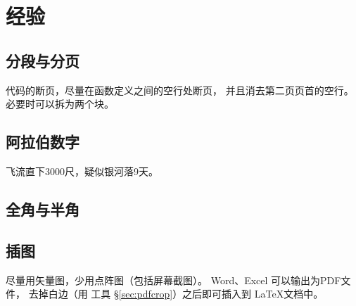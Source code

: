 \chapter{经验}

\section{分段与分页}



代码的断页，尽量在函数定义之间的空行处断页，
并且消去第二页页首的空行。必要时可以拆为两个块。

\section{阿拉伯数字}

飞流直下3000尺，疑似银河落9天。

\section{全角与半角}

\section{插图}

尽量用矢量图，少用点阵图（包括屏幕截图）。
Word、Excel 可以输出为PDF文件，
去掉白边（用  工具 \S \ref{sec:pdfcrop}）之后即可插入到 \LaTeX 文档中。
